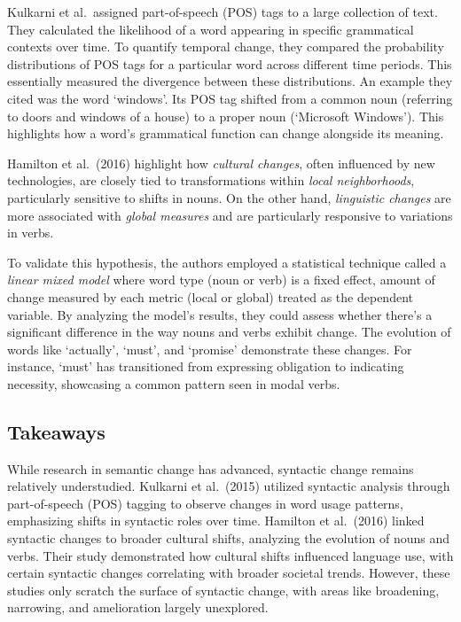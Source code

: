 Kulkarni et al.\ assigned part-of-speech (POS) tags to a large collection of text.
They calculated the likelihood of a word appearing in specific grammatical contexts over time.
To quantify temporal change, they compared the probability distributions of POS tags for a particular word across different time periods.
This essentially measured the divergence between these distributions.
An example they cited was the word `windows'.
Its POS tag shifted from a common noun (referring to doors and windows of a house) to a proper noun (`Microsoft Windows').
This highlights how a word's grammatical function can change alongside its meaning.

Hamilton et al.\ (2016) highlight how \emph{cultural changes}, often influenced by new technologies, are closely tied to transformations within \emph{local neighborhoods}, particularly sensitive to shifts in nouns.
On the other hand, \emph{linguistic changes} are more associated with \emph{global measures} and are particularly responsive to variations in verbs.

To validate this hypothesis, the authors employed a statistical technique called a \emph{linear mixed model} where word type (noun or verb) is a fixed effect,
amount of change measured by each metric (local or global) treated as the dependent variable.
By analyzing the model's results, they could assess whether there's a significant difference in the way nouns and verbs exhibit change.
The evolution of words like `actually', `must', and `promise' demonstrate these changes.
For instance, `must' has transitioned from expressing obligation to indicating necessity, showcasing a common pattern seen in modal verbs.

\subsection{Takeaways}\label{subsec:takeaways3}
While research in semantic change has advanced, syntactic change remains relatively understudied.
Kulkarni et al.\ (2015) utilized syntactic analysis through part-of-speech (POS) tagging to observe changes in word usage patterns, emphasizing shifts in syntactic roles over time.
Hamilton et al.\ (2016) linked syntactic changes to broader cultural shifts, analyzing the evolution of nouns and verbs.
Their study demonstrated how cultural shifts influenced language use, with certain syntactic changes correlating with broader societal trends.
However, these studies only scratch the surface of syntactic change, with areas like broadening, narrowing, and amelioration largely unexplored.

